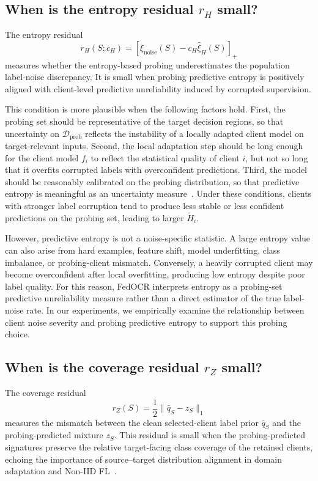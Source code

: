 \subsection{When is the entropy residual $r_H$ small?}
\label{app:entropy_residual}

The entropy residual
\[
r_H(S;c_H)
=
\left[
\xi_{\mathrm{noise}}(S)
-
c_H\widehat{\xi}_{H}(S)
\right]_+
\]
measures whether the entropy-based probing underestimates the population label-noise discrepancy.
It is small when probing predictive entropy is positively aligned with client-level predictive unreliability induced by corrupted supervision.

This condition is more plausible when the following factors hold.
First, the probing set should be representative of the target decision regions, so that uncertainty on $\mathcal D_{\mathrm{prob}}$ reflects the instability of a locally adapted client model on target-relevant inputs.
Second, the local adaptation step should be long enough for the client model $f_i$ to reflect the statistical quality of client $i$, but not so long that it overfits corrupted labels with overconfident predictions.
Third, the model should be reasonably calibrated on the probing distribution, so that predictive entropy is meaningful as an uncertainty measure~\cite{guo2017calibration}.
Under these conditions, clients with stronger label corruption tend to produce less stable or less confident predictions on the probing set, leading to larger $\widetilde H_i$.

However, predictive entropy is not a noise-specific statistic.
A large entropy value can also arise from hard examples, feature shift, model underfitting, class imbalance, or probing-client mismatch.
Conversely, a heavily corrupted client may become overconfident after local overfitting, producing low entropy despite poor label quality.
For this reason, FedOCR interprets entropy as a probing-set predictive unreliability measure rather than a direct estimator of the true label-noise rate.
In our experiments, we empirically examine the relationship between client noise severity and probing predictive entropy to support this probing choice.

\subsection{When is the coverage residual $r_Z$ small?}
\label{app:coverage_residual}

The coverage residual
\[
r_Z(S)
=
\frac12\|\bar q_S-z_S\|_1
\]
measures the mismatch between the clean selected-client label prior $\bar q_S$ and the probing-predicted mixture $z_S$.
This residual is small when the probing-predicted signatures preserve the relative target-facing class coverage of the retained clients, echoing the importance of source--target distribution alignment in domain adaptation and Non-IID FL~\cite{ben2010theory,hsu2019measuring,zhu2021survey}.

